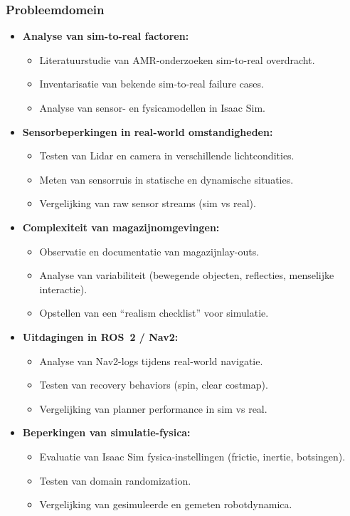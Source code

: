 \subsubsection{Probleemdomein}
\begin{itemize}
    \item \textbf{Analyse van sim-to-real factoren:}
    \begin{itemize}
        \item Literatuurstudie van AMR-onderzoeken sim-to-real overdracht.
        \item Inventarisatie van bekende sim-to-real failure cases.
        \item Analyse van sensor- en fysicamodellen in Isaac Sim.
    \end{itemize}

    \item \textbf{Sensorbeperkingen in real‑world omstandigheden:}
    \begin{itemize}
        \item Testen van Lidar en camera in verschillende lichtcondities.
        \item Meten van sensorruis in statische en dynamische situaties.
        \item Vergelijking van raw sensor streams (sim vs real).
    \end{itemize}

    \item \textbf{Complexiteit van magazijnomgevingen:}
    \begin{itemize}
        \item Observatie en documentatie van magazijnlay-outs.
        \item Analyse van variabiliteit (bewegende objecten, reflecties, menselijke interactie).
        \item Opstellen van een “realism checklist” voor simulatie.
    \end{itemize}

    \item \textbf{Uitdagingen in ROS~2 / Nav2:}
    \begin{itemize}
        \item Analyse van Nav2-logs tijdens real‑world navigatie.
        \item Testen van recovery behaviors (spin, clear costmap).
        \item Vergelijking van planner performance in sim vs real.
    \end{itemize}

    \item \textbf{Beperkingen van simulatie-fysica:}
    \begin{itemize}
        \item Evaluatie van Isaac Sim fysica-instellingen (frictie, inertie, botsingen).
        \item Testen van domain randomization.
        \item Vergelijking van gesimuleerde en gemeten robotdynamica.
    \end{itemize}
\end{itemize}

